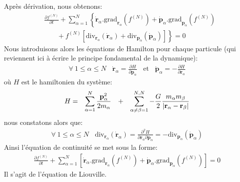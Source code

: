 Après dérivation, nous obtenons:
\begin{align*}
	&  \frac{\partial f^{(N)}}{\partial t}+\displaystyle\sum\limits_{\alpha=1}%
	^{N}\left\{  \mathbf{\dot{r}}_{\alpha}.\mathrm{grad}_{\mathbf{r}_{\alpha}%
	}\left(  f^{(N)}\right)  +\mathbf{\dot{p}}_{\alpha}.\mathrm{grad}%
	_{\mathbf{p}_{\alpha}}\left(  f^{(N)}\right)  \right. \\
	&  \,\;\;\;\;\;\;\;\left.  +~f^{(N)}\left[  \mathrm{div}_{\mathbf{r}_{\alpha}%
	}\left(  \mathbf{\dot{r}}_{\alpha}\right)  +\mathrm{div}_{\mathbf{p}_{\alpha}%
	}\left(  \mathbf{\dot{p}}_{\alpha}\right)  \right]  \right\}=0
\end{align*}
Nous introduisons alors les équations de Hamilton pour chaque particule (qui reviennent ici à écrire le principe fondamental de la dynamique):
\begin{align*}
	\forall~1\leq\alpha\leq N~~~~\mathbf{\dot{r}}_{\alpha}=\frac{\partial H}{\partial\mathbf{p}_{\alpha}}~~~~\text{et}~~~~\mathbf{\dot{p}}_{\alpha
	}=-\frac{\partial H}{\partial\mathbf{r}_{\alpha}}
\end{align*}
où $H$ est le hamiltonien du système:
\begin{align*}
	\begin{array}[c]{cccc}
		H= & \displaystyle\sum\limits_{\alpha=1}^{N}\dfrac{\mathbf{p}_{\alpha}^{2}}{2m_{\alpha}} & + & \displaystyle\sum\limits_{\alpha\neq\beta=1}^{N,N}%
		-\dfrac{G}{2}\dfrac{m_{\alpha}m_{\beta}}{\left\vert \mathbf{r}_{\alpha}-\mathbf{r}_{\beta}\right\vert }%
	\end{array}
\end{align*}
nous constatons alors que:
\begin{align*}
	\forall~1\leq\alpha\leq N~~~~\mathrm{div}_{\mathbf{r}_{\alpha}}\left(\mathbf{\dot{r}}_{\alpha}\right)  =\frac{\partial^{2}H}{\partial
	\mathbf{r}_{\alpha}\partial\mathbf{p}_{\alpha}}=-\mathrm{div}_{\mathbf{p}_{\alpha}}\left(  \mathbf{\dot{p}}_{\alpha}\right)
\end{align*}
Ainsi l'équation de continuité se met sous la forme:
\begin{align}
	\frac{\partial f^{(N)}}{\partial t}+\sum_{\alpha=1}^{N}\left[  \mathbf{\dot{r}}_{\alpha}.\mathrm{grad}_{\mathbf{r}_{\alpha}}\left(  f^{(N)}\right)
	+\mathbf{\dot{p}}_{\alpha}.\mathrm{grad}_{\mathbf{p}_{\alpha}}\left(f^{(N)}\right)  \right]  =0\label{liouville}%
\end{align}
Il s'agit de l'équation de Liouville.

